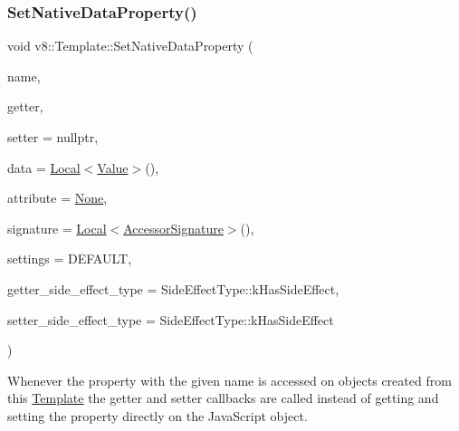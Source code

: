 \subsubsection{\texorpdfstring{Set\+Native\+Data\+Property()}{SetNativeDataProperty()}}
{\footnotesize\ttfamily void v8\+::\+Template\+::\+Set\+Native\+Data\+Property (\begin{DoxyParamCaption}\item[{\mbox{\hyperlink{classv8_1_1Local}{v8\+::\+Local}}$<$ \mbox{\hyperlink{classv8_1_1String}{String}} $>$}]{name,  }\item[{\mbox{\hyperlink{namespacev8_a722613c87061708a4f1aa050d095f868}{Accessor\+Getter\+Callback}}}]{getter,  }\item[{Accessor\+Setter\+Callback}]{setter = {\ttfamily nullptr},  }\item[{\mbox{\hyperlink{classv8_1_1Local}{v8\+::\+Local}}$<$ \mbox{\hyperlink{classv8_1_1Value}{Value}} $>$}]{data = {\ttfamily \mbox{\hyperlink{classv8_1_1Local}{Local}}$<$\mbox{\hyperlink{classv8_1_1Value}{Value}}$>$()},  }\item[{\mbox{\hyperlink{namespacev8_a05f25f935e108a1ea2d150e274602b87}{Property\+Attribute}}}]{attribute = {\ttfamily \mbox{\hyperlink{namespacev8_a05f25f935e108a1ea2d150e274602b87a7ab4d58719c33b3ea2dfaefa29b111df}{None}}},  }\item[{\mbox{\hyperlink{classv8_1_1Local}{v8\+::\+Local}}$<$ \mbox{\hyperlink{classv8_1_1AccessorSignature}{Accessor\+Signature}} $>$}]{signature = {\ttfamily \mbox{\hyperlink{classv8_1_1Local}{Local}}$<$\mbox{\hyperlink{classv8_1_1AccessorSignature}{Accessor\+Signature}}$>$()},  }\item[{\mbox{\hyperlink{namespacev8_a31d8355cb043d7d2dda3f4a52760b64e}{Access\+Control}}}]{settings = {\ttfamily DEFAULT},  }\item[{\mbox{\hyperlink{namespacev8_a29711319c2b9fc7716d65faee2f7b9cb}{Side\+Effect\+Type}}}]{getter\+\_\+side\+\_\+effect\+\_\+type = {\ttfamily SideEffectType\+:\+:kHasSideEffect},  }\item[{\mbox{\hyperlink{namespacev8_a29711319c2b9fc7716d65faee2f7b9cb}{Side\+Effect\+Type}}}]{setter\+\_\+side\+\_\+effect\+\_\+type = {\ttfamily SideEffectType\+:\+:kHasSideEffect} }\end{DoxyParamCaption})}

Whenever the property with the given name is accessed on objects created from this \mbox{\hyperlink{classv8_1_1Template}{Template}} the getter and setter callbacks are called instead of getting and setting the property directly on the Java\+Script object.


